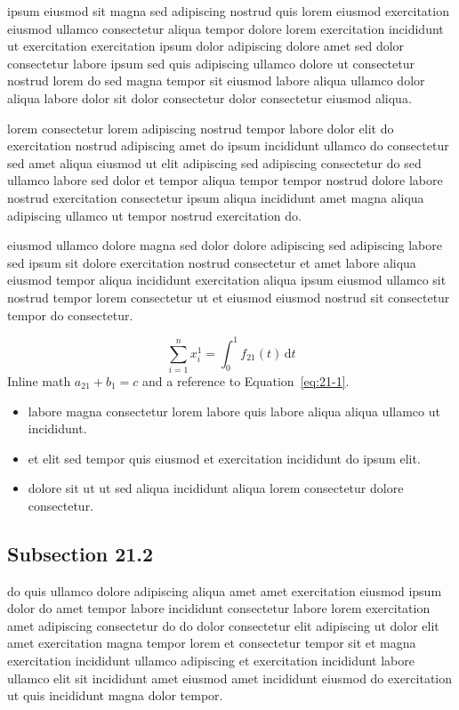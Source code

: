 \documentclass{article}
\begin{document}
ipsum eiusmod sit magna sed adipiscing nostrud quis lorem eiusmod exercitation eiusmod ullamco consectetur aliqua tempor dolore lorem exercitation incididunt ut exercitation exercitation ipsum dolor adipiscing dolore amet sed dolor consectetur labore ipsum sed quis adipiscing ullamco dolore ut consectetur nostrud lorem do sed magna tempor sit eiusmod labore aliqua ullamco dolor aliqua labore dolor sit dolor consectetur dolor consectetur eiusmod aliqua.

lorem consectetur lorem adipiscing nostrud tempor labore dolor elit do exercitation nostrud adipiscing amet do ipsum incididunt ullamco do consectetur sed amet aliqua eiusmod ut elit adipiscing sed adipiscing consectetur do sed ullamco labore sed dolor et tempor aliqua tempor tempor nostrud dolore labore nostrud exercitation consectetur ipsum aliqua incididunt amet magna aliqua adipiscing ullamco ut tempor nostrud exercitation do.

eiusmod ullamco dolore magna sed dolor dolore adipiscing sed adipiscing labore sed ipsum sit dolore exercitation nostrud consectetur et amet labore aliqua eiusmod tempor aliqua incididunt exercitation aliqua ipsum eiusmod ullamco sit nostrud tempor lorem consectetur ut et eiusmod eiusmod nostrud sit consectetur tempor do consectetur.

\begin{equation}\label{eq:21-1}
  \sum_{i=1}^{n} x_i^{1} = \int_0^1 f_{21}(t)\,\mathrm{d}t
\end{equation}
Inline math $a_{21} + b_{1} = c$ and a reference to Equation~\eqref{eq:21-1}.

\begin{itemize}
  \item labore magna consectetur lorem labore quis labore aliqua aliqua ullamco ut incididunt.
  \item et elit sed tempor quis eiusmod et exercitation incididunt do ipsum elit.
  \item dolore sit ut ut sed aliqua incididunt aliqua lorem consectetur dolore consectetur.
\end{itemize}

\subsection{Subsection 21.2}\label{sec:21-2}
do quis ullamco dolore adipiscing aliqua amet amet exercitation eiusmod ipsum dolor do amet tempor labore incididunt consectetur labore lorem exercitation amet adipiscing consectetur do do dolor consectetur elit adipiscing ut dolor elit amet exercitation magna tempor lorem et consectetur tempor sit et magna exercitation incididunt ullamco adipiscing et exercitation incididunt labore ullamco elit sit incididunt amet eiusmod amet incididunt eiusmod do exercitation ut quis incididunt magna dolor tempor.
\end{document}
